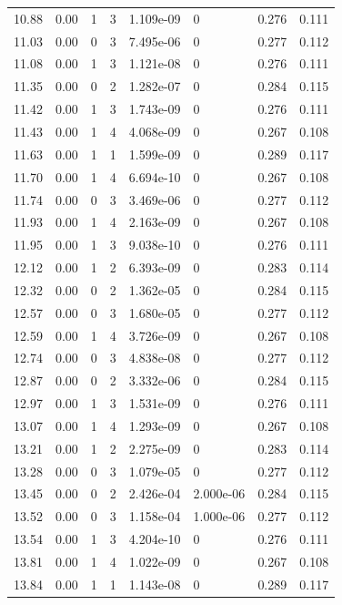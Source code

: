 \documentclass[preview]{standalone}
\begin{document}
{{{\begin{tabular}{L{1.2cm}C{1.2cm} C{0.3cm}C{0.5cm} C{1.4cm}C{1.4cm} C{1.4cm}C{1.4cm}}
  10.88  &  0.00  & 1     &  3 &  1.109e-09  & 0  & 0.276 &  0.111   \\ 
  11.03  &  0.00  & 0     &  3 &  7.495e-06  & 0  & 0.277 &  0.112   \\ 
  11.08  &  0.00  & 1     &  3 &  1.121e-08  & 0  & 0.276 &  0.111   \\ 
  11.35  &  0.00  & 0     &  2 &  1.282e-07  & 0  & 0.284 &  0.115   \\ 
  11.42  &  0.00  & 1     &  3 &  1.743e-09  & 0  & 0.276 &  0.111   \\ 
  11.43  &  0.00  & 1     &  4 &  4.068e-09  & 0  & 0.267 &  0.108   \\ 
  11.63  &  0.00  & 1     &  1 &  1.599e-09  & 0  & 0.289 &  0.117   \\ 
  11.70  &  0.00  & 1     &  4 &  6.694e-10  & 0  & 0.267 &  0.108   \\ 
  11.74  &  0.00  & 0     &  3 &  3.469e-06  & 0  & 0.277 &  0.112   \\ 
  11.93  &  0.00  & 1     &  4 &  2.163e-09  & 0  & 0.267 &  0.108   \\ 
  11.95  &  0.00  & 1     &  3 &  9.038e-10  & 0  & 0.276 &  0.111   \\ 
  12.12  &  0.00  & 1     &  2 &  6.393e-09  & 0  & 0.283 &  0.114   \\ 
  12.32  &  0.00  & 0     &  2 &  1.362e-05  & 0  & 0.284 &  0.115   \\ 
  12.57  &  0.00  & 0     &  3 &  1.680e-05  & 0  & 0.277 &  0.112   \\ 
  12.59  &  0.00  & 1     &  4 &  3.726e-09  & 0  & 0.267 &  0.108   \\ 
  12.74  &  0.00  & 0     &  3 &  4.838e-08  & 0  & 0.277 &  0.112   \\ 
  12.87  &  0.00  & 0     &  2 &  3.332e-06  & 0  & 0.284 &  0.115   \\ 
  12.97  &  0.00  & 1     &  3 &  1.531e-09  & 0  & 0.276 &  0.111   \\ 
  13.07  &  0.00  & 1     &  4 &  1.293e-09  & 0  & 0.267 &  0.108   \\ 
  13.21  &  0.00  & 1     &  2 &  2.275e-09  & 0  & 0.283 &  0.114   \\ 
  13.28  &  0.00  & 0     &  3 &  1.079e-05  & 0  & 0.277 &  0.112   \\ 
  13.45  &  0.00  & 0     &  2 &  2.426e-04  & 2.000e-06  & 0.284 &  0.115   \\ 
  13.52  &  0.00  & 0     &  3 &  1.158e-04  & 1.000e-06  & 0.277 &  0.112   \\ 
  13.54  &  0.00  & 1     &  3 &  4.204e-10  & 0  & 0.276 &  0.111   \\ 
  13.81  &  0.00  & 1     &  4 &  1.022e-09  & 0  & 0.267 &  0.108   \\ 
  13.84  &  0.00  & 1     &  1 &  1.143e-08  & 0  & 0.289 &  0.117   \\ 
\hline 
\end{tabular} 

}}}
\end{document}
